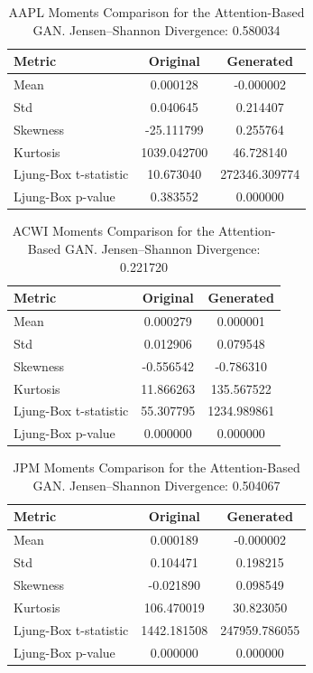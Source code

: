 \documentclass{article}
\begin{document}
\begin{table}[ht]
\centering
\begin{tabular}{lcc}
\hline
\textbf{Metric} & \textbf{Original} & \textbf{Generated} \\
\hline
Mean     & 0.000128 & -0.000002 \\
Std      & 0.040645 & 0.214407 \\
Skewness & -25.111799 & 0.255764 \\
Kurtosis & 1039.042700 & 46.728140 \\
Ljung-Box t-statistic & 10.673040 & 272346.309774 \\
Ljung-Box p-value & 0.383552 & 0.000000 \\
\hline
\end{tabular}
\caption{AAPL Moments Comparison for the Attention-Based GAN.
Jensen--Shannon Divergence: 0.580034}
\label{tab:aapl_attention}
\end{table}

\begin{table}[ht]
\centering
\begin{tabular}{lcc}
\hline
\textbf{Metric} & \textbf{Original} & \textbf{Generated} \\
\hline
Mean     & 0.000279 & 0.000001 \\
Std      & 0.012906 & 0.079548 \\
Skewness & -0.556542 & -0.786310 \\
Kurtosis & 11.866263 & 135.567522 \\
Ljung-Box t-statistic & 55.307795 & 1234.989861 \\
Ljung-Box p-value & 0.000000 & 0.000000 \\
\hline
\end{tabular}
\caption{ACWI Moments Comparison for the Attention-Based GAN.
Jensen--Shannon Divergence: 0.221720}
\label{tab:acwi_attention}
\end{table}

\begin{table}[ht]
\centering
\begin{tabular}{lcc}
\hline
\textbf{Metric} & \textbf{Original} & \textbf{Generated} \\
\hline
Mean     & 0.000189 & -0.000002 \\
Std      & 0.104471 & 0.198215 \\
Skewness & -0.021890 & 0.098549 \\
Kurtosis & 106.470019 & 30.823050 \\
Ljung-Box t-statistic & 1442.181508 & 247959.786055 \\
Ljung-Box p-value & 0.000000 & 0.000000 \\
\hline
\end{tabular}
\caption{JPM Moments Comparison for the Attention-Based GAN.
Jensen--Shannon Divergence: 0.504067}
\label{tab:jpm_attention}
\end{table}
\end{document}

